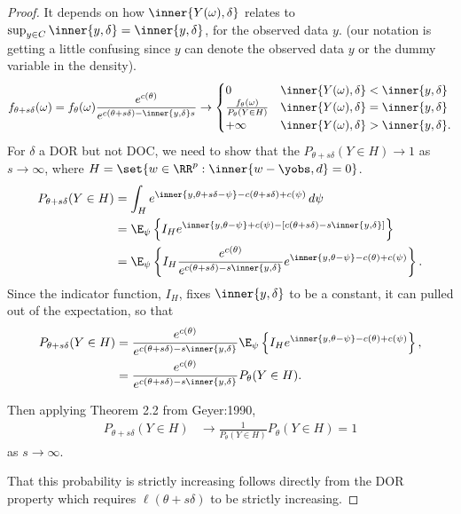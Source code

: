 \begin{proof}
It depends on how $\inner{Y(\omega),\delta}$ relates to $\sup_{y \in C}\inner{y,
\delta} = \inner{y,\delta}$, for the observed data $y$.  (our notation is getting a 
little confusing since $y$ can denote the observed data $y$ or the dummy variable in 
the density).  
\begin{align*}
	f_{\theta+s\delta}(\omega) = f_\theta(\omega) \frac{e^{c(\theta)}}{e^{ c(\theta+s
\delta) - \inner{y,\delta}s } } 
	\to	
			\begin{cases} 
			0 								& \inner{Y(\omega),\delta} < \inner{y,
\delta} \\
			\frac{f_\theta(\omega)}{P_\theta(Y \in H)} 	& \inner{Y(\omega) ,
\delta} = \inner{y,\delta} \\
			+\infty							& \inner{Y(\omega),\delta} > \inner{y,
\delta}.
	\end{cases}
\end{align*}
For $\delta$ a DOR but not DOC, we need to show that the $P_{\theta+s\delta}(Y \in H) 
\to 1$ 
as $s \to \infty$, where $H = \set{w \in \RR^p: \inner{w-\yobs,d}=0}$.
\begin{align*}
 P_{\theta+s\delta}(Y \in H) &= \int_H e^{\inner{y, \theta+s\delta - \psi} - c(\theta
+s\delta) + c(\psi)} \, d\psi \\
		&= \E_\psi \left \{ I_H e^{\inner{y, \theta - \psi} +c(\psi) - [c(\theta+s
\delta) -s\inner{y,\delta}]} \right 
\}\\
		&= \E_\psi \left \{ I_H  \frac{e^{c(\theta)} }{ e^{ c(\theta+s\delta) -s\inner
{y,\delta} } } 
		e^{\inner{y, \theta - \psi} -c(\theta)+c(\psi)}  \right \}.
\end{align*}
Since the indicator function, $I_H$, fixes $\inner{ y, \delta}$ to be a constant, it 
can pulled out of the expectation, so that 
\begin{align*}
		 P_{\theta+s\delta}(Y \in H)
		 &= \frac{e^{c(\theta)} }{ e^{ c(\theta+s\delta) -s\inner{y,\delta} } }
		 \E_\psi \left \{ I_H   
		e^{\inner{y, \theta - \psi} -c(\theta)+c(\psi)}  \right \}, \\
		 &= \frac{e^{c(\theta)} }{ e^{ c(\theta+s\delta) -s\inner{y,\delta} } } 
		 P_\theta ( Y \in H ).
		 \end{align*}
 
Then applying Theorem 2.2 from Geyer:1990,
\begin{align*}
 P_{\theta+s\delta}(Y \in H)
		&\to \frac{1}{P_\theta(Y \in H)}  P_{\theta}(Y \in H) = 1
 \end{align*}
 as $s \to \infty$.  
 
 That this probability is strictly increasing follows directly from the DOR property 
which requires $\ell( \theta+s
\delta)$ to be strictly increasing.   
\end{proof}


